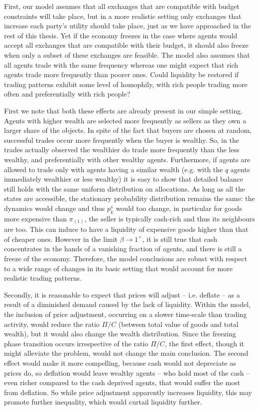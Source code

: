 First, our model assumes that all exchanges that are compatible with budget constraints will take place, but in a more realistic setting only exchanges that increase each party's utility should take place, just as we have approached in the rest of this thesis. Yet if the economy freezes in the case where agents would accept all exchanges that are compatible with their budget, it should also freeze when only a subset of these exchanges are feasible. The model also assumes that all agents trade with the same frequency whereas one might expect that rich agents trade more frequently than poorer ones. Could liquidity be restored if trading patterns exhibit some level of homophily, with rich people trading more often and preferentially with rich people? 

First we note that both these effects are already present in our simple setting. Agents with higher wealth are selected more frequently as sellers as they own a larger share of the objects. In spite of the fact that buyers are chosen at random, successful trades occur more frequently when the buyer is wealthy. So, in the trades actually observed the wealthier do trade more frequently than the less wealthy, and preferentially with other wealthy agents. Furthermore, if agents are allowed to trade only with agents having a similar wealth (e.g. with the $q$ agents immediately wealthier or less wealthy) it is easy to show that detailed balance still holds with the same uniform distribution on allocations. As long as all the states are accessible, the stationary probability distribution remains the same: the dynamics would change and thus $p_k^s$ would too change, in particular for goods more expensive than $\pi_{(1)}$, the seller is typically cash-rich and thus its neighbours are too. This can induce to have a liquidity of expensive goods higher than that of cheaper ones. However in the limit $\beta \to 1^{+}$, it is still true that cash concentrates in the hands of a vanishing fraction of agents, and there is still a freeze of the economy. Therefore, the model conclusions are robust with respect to a wide range of changes in its basic setting that would account for more realistic trading patterns. 

Secondly, it is reasonable to expect that prices will adjust -- i.e. deflate -- as a result of a diminished demand caused by the lack of liquidity. Within the model, the inclusion of price adjustment, occurring on a slower time-scale than trading activity, would reduce the ratio $\Pi/C$ (between total value of goods and total wealth), but it would also change the wealth distribution. Since the freezing phase transition occurs irrespective of the ratio $\Pi/C$, the first effect, though it might alleviate the problem, would not change the main conclusion. The second effect would make it more compelling, because cash would not depreciate as prices do, so deflation would leave 
wealthy agents -- who hold most of the cash -- even richer compared to the cash deprived agents, that would suffer the most from deflation. So while price adjustment apparently increases liquidity, this may promote further inequality, which would curtail liquidity further. 

